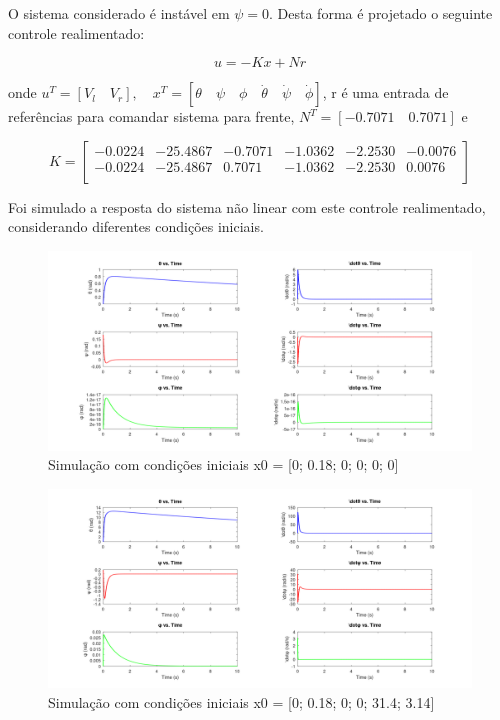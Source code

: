 \documentclass[10pt]{article}
\begin{document}
\quad O sistema considerado é instável em $\psi = 0$.
Desta forma é projetado o seguinte controle realimentado:

\begin{equation}
    u = -Kx + Nr
\end{equation}

onde $u^T = [V_l \quad V_r], \quad x^T = [\theta \quad \psi \quad \phi \quad \dot{\theta} \quad \dot{\psi} \quad \dot{\phi}]$,
r é uma entrada de referências para comandar sistema para frente, $N^T = [-0.7071 \quad 0.7071]$ e

\begin{equation}
    K = \begin{bmatrix}
    -0.0224 & -25.4867 & -0.7071 & -1.0362 & -2.2530 & -0.0076 \\
    -0.0224 & -25.4867 & 0.7071 & -1.0362 & -2.2530 & 0.0076 \\
\end{bmatrix}
\end{equation}

\quad Foi simulado a resposta do sistema não linear com este controle realimentado,
considerando diferentes condições iniciais.

\begin{figure}[h]
    \centering
    \includegraphics[scale=0.17]{ode45_1_r.png}
    \caption{Simulação com condições iniciais x0 = [0; 0.18; 0; 0; 0; 0]}
\end{figure}

\begin{figure}[h]
    \centering
    \includegraphics[scale=0.17]{ode45_2_r.png}
    \caption{Simulação com condições iniciais x0 = [0; 0.18; 0; 0; 31.4; 3.14]}
\end{figure}
\end{document}
